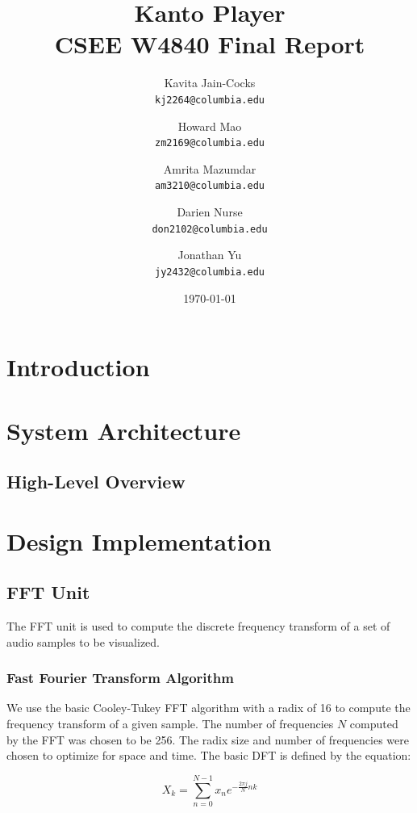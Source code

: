 \documentclass{article}
\title{Kanto Player \\
CSEE W4840 Final Report}
\author{
  Kavita Jain-Cocks\\
  \texttt{kj2264@columbia.edu}
  \and
  Howard Mao\\
  \texttt{zm2169@columbia.edu}
  \and
  Amrita Mazumdar\\
  \texttt{am3210@columbia.edu}
  \and
  Darien Nurse\\
  \texttt{don2102@columbia.edu}
  \and
  Jonathan Yu\\
  \texttt{jy2432@columbia.edu}
   \\}
\date{\today}
\begin{document}
\maketitle
\newpage


\section{Introduction}

\section{System Architecture}

\subsection{High-Level Overview}

\section{Design Implementation}
\subsection{FFT Unit}
The FFT unit is used to compute the discrete frequency transform of a set of audio
samples to be visualized. 

\subsubsection{Fast Fourier Transform Algorithm}
We use the basic Cooley-Tukey FFT algorithm with a radix of 16 to compute the
frequency transform of a given sample. The number of frequencies \(N\) computed by 
the FFT was chosen to be 256. The radix size and number of frequencies were chosen 
to optimize for space and time. The basic DFT is defined by the equation:

\begin{equation}
	X_k = \sum_{n=0}^{N-1} x_n e^{-\frac{2\pi j}{N} nk}
\end{equation}
\end{document}
